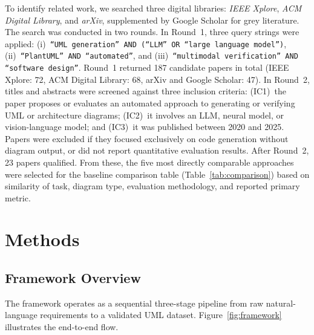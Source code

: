 \documentclass[conference]{IEEEtran}
\begin{document}
To identify related work, we searched three digital libraries:
\textit{IEEE Xplore}, \textit{ACM Digital Library}, and \textit{arXiv},
supplemented by Google Scholar for grey literature. The search was
conducted in two rounds. In Round~1, three query strings were applied:
(i)~\texttt{``UML generation'' AND (``LLM'' OR ``large language
model'')}, (ii)~\texttt{``PlantUML'' AND ``automated''}, and
(iii)~\texttt{``multimodal verification'' AND ``software design''}.
Round~1 returned 187 candidate papers in total (IEEE Xplore: 72,
ACM Digital Library: 68, arXiv and Google Scholar: 47). In Round~2,
titles and abstracts were screened against three inclusion criteria:
(IC1)~the paper proposes or evaluates an automated approach to
generating or verifying UML or architecture diagrams; (IC2)~it involves
an LLM, neural model, or vision-language model; and (IC3)~it was
published between 2020 and 2025. Papers were excluded if they focused
exclusively on code generation without diagram output, or did not report
quantitative evaluation results. After Round~2, 23 papers qualified.
From these, the five most directly comparable approaches were selected
for the baseline comparison table (Table~\ref{tab:comparison}) based on
similarity of task, diagram type, evaluation methodology, and reported
primary metric.

\section{Methods}

\subsection{Framework Overview}

The framework operates as a sequential three-stage pipeline from raw
natural-language requirements to a validated UML dataset. Figure~\ref{fig:framework}
illustrates the end-to-end flow.
\end{document}
